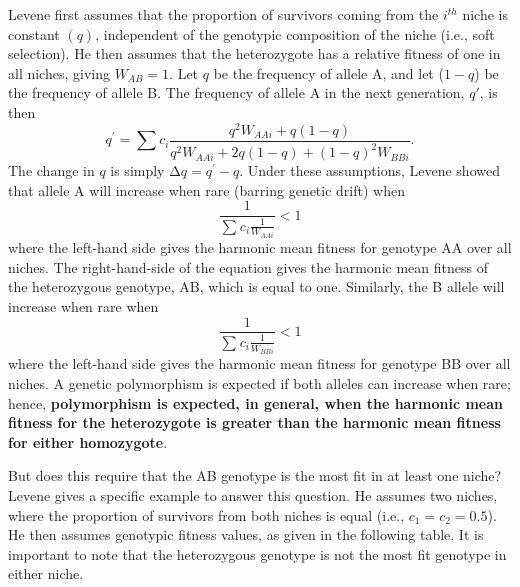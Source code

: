 \documentclass[
  letterpaper,
]{book}
\begin{document}
Levene first assumes that the proportion of survivors coming from the
\(i^{th}\) niche is constant \((q)\), independent of the genotypic
composition of the niche (i.e., soft selection). He then assumes that
the heterozygote has a relative fitness of one in all niches, giving
\(W_{AB} = 1\). Let \(q\) be the frequency of allele A, and let
(\(1 - q\)) be the frequency of allele B. The frequency of allele A in
the next generation, \(q'\), is then
\[q^{'} = \sum_{}^{}c_{i}\frac{q^{2}W_{AAi} + q(1 - q)}{q^{2}W_{AAi} + 2q(1 - q) + (1 - q)^{2}W_{BBi}}.\]
The change in \(q\) is simply \(\mathrm{\Delta}q = q^{'} - q\). Under
these assumptions, Levene showed that allele A will increase when rare
(barring genetic drift) when
\[\frac{1}{\sum_{}^{}{c_{i}\frac{1}{W_{AAi}}}} < 1\] where the left-hand
side gives the harmonic mean fitness for genotype AA over all niches.
The right-hand-side of the equation gives the harmonic mean fitness of
the heterozygous genotype, AB, which is equal to one. Similarly, the B
allele will increase when rare when
\[\frac{1}{\sum_{}^{}{c_{i}\frac{1}{W_{BBi}}}} < 1\] where the left-hand
side gives the harmonic mean fitness for genotype BB over all niches. A
genetic polymorphism is expected if both alleles can increase when rare;
hence, \textbf{polymorphism is expected, in general, when the harmonic
mean fitness for the heterozygote is greater than the harmonic mean
fitness for either homozygote}.

But does this require that the AB genotype is the most fit in at least
one niche? Levene gives a specific example to answer this question. He
assumes two niches, where the proportion of survivors from both niches
is equal (i.e., \(c_{1} = c_{2} = 0.5\)). He then assumes genotypic
fitness values, as given in the following table. It is important to note
that the heterozygous genotype is not the most fit genotype in either
niche.
\end{document}
